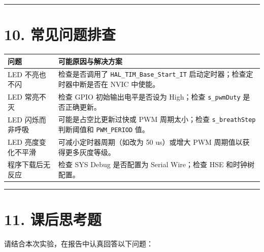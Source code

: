 \documentclass[
  chinese,
  UTF8,
  oneside,
  openany]{ctexbook}
\begin{document}
\begin{center}\rule{0.5\linewidth}{0.5pt}\end{center}

\section{10. 常见问题排查}\label{ux5e38ux89c1ux95eeux9898ux6392ux67e5-3}

\begin{longtable}[]{@{}
  >{\raggedright\arraybackslash}p{}
  >{\raggedright\arraybackslash}p{}@{}}
\toprule\noalign{}
\begin{minipage}[b]{\linewidth}\raggedright
问题
\end{minipage} & \begin{minipage}[b]{\linewidth}\raggedright
可能原因与解决方案
\end{minipage} \\
\midrule\noalign{}
\endhead
\bottomrule\noalign{}
\endlastfoot
LED 不亮也不闪 & 检查是否调用了 \texttt{HAL\_TIM\_Base\_Start\_IT}
启动定时器；检查定时器中断是否在 NVIC 中使能。 \\
LED 常亮不灭 & 检查 GPIO 初始输出电平是否设为 High；检查
\texttt{s\_pwmDuty} 是否正确更新。 \\
LED 闪烁而非呼吸 & 可能是占空比更新过快或 PWM 周期太小；检查
\texttt{s\_breathStep} 判断阈值和 \texttt{PWM\_PERIOD} 值。 \\
LED 亮度变化不平滑 & 可减小定时器周期（如改为 50 us）或增大 PWM
周期值以获得更多灰度等级。 \\
程序下载后无反应 & 检查 SYS Debug 是否配置为 Serial Wire；检查 HSE
和时钟树配置。 \\
\end{longtable}

\begin{center}\rule{0.5\linewidth}{0.5pt}\end{center}

\section{11. 课后思考题}\label{ux8bfeux540eux601dux8003ux9898-3}

请结合本次实验，在报告中认真回答以下问题：
\end{document}
